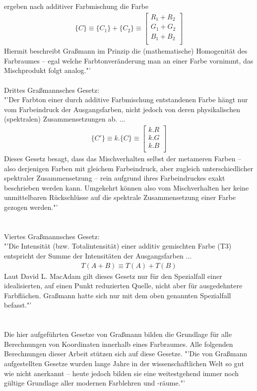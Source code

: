 \documentclass[11pt]{scrartcl}
\begin{document}
ergeben nach additiver Farbmischung die Farbe
\begin{align}\label{Equ:4}
    \{C\} \equiv \{C_1\} +\{C_2\} \equiv \left[ \begin{array}{r}
        R_1 + R_2 \\
        G_1 + G_2 \\
        B_1 + B_2 \\
    \end{array}\right]
\end{align}
Hiermit beschreibt Graßmann im Prinzip die (mathematische) Homogenität des Farbraumes – egal welche Farbtonveränderung man an einer Farbe
vornimmt, das Mischprodukt folgt analog."'\cite{wikipediaGrassmannGestze}\\
\\
Drittes Graßmannsches Gesetz:\\
"'Der Farbton einer durch additive Farbmischung entstandenen Farbe hängt nur vom Farbeindruck der Ausgangsfarben, nicht jedoch von deren
physikalischen (spektralen) Zusammensetzungen ab. ...
\begin{align}\label{Equ:5}
    \{C'\} \equiv k.\{C\} \equiv \left[ \begin{array}{r}
        k.R \\
        k.G \\
        k.B \\
    \end{array}\right]
\end{align}
Dieses Gesetz besagt, dass das Mischverhalten selbst der metameren Farben – also derjenigen Farben mit gleichem Farbeindruck, aber
zugleich unterschiedlicher spektraler Zusammensetzung – rein aufgrund ihres Farbeindruckes exakt beschrieben werden kann. Umgekehrt können
also vom Mischverhalten her keine unmittelbaren Rückschlüsse auf die spektrale Zusammensetzung einer Farbe gezogen werden."'\\
\cite{wikipediaGrassmannGestze}\\
\\
Viertes Graßmannsches Gesetz:\\
"'Die Intensität (bzw. Totalintensität) einer additiv gemischten Farbe (T3) entspricht der Summe der Intensitäten der Ausgangsfarben ...
\begin{align}\label{Equ:6}
    T(A+B) \equiv T(A) + T(B)
\end{align}
Laut David L. MacAdam gilt dieses Gesetz nur für den Spezialfall einer idealisierten, auf einen Punkt reduzierten Quelle, nicht aber für
ausgedehntere Farbflächen. Graßmann hatte sich nur mit dem oben genannten Spezialfall befasst."'\\
\cite{wikipediaGrassmannGestze}\\
\\
Die hier aufgeführten Gesetze von Graßmann bilden die Grundlage für alle Berechnungen von Koordinaten innerhalb eines Farbraumes. Alle folgenden
Berechnungen dieser Arbeit stützen sich auf diese Gesetze. "'Die von Graßmann aufgestellten Gesetze wurden lange Jahre in der
wissenschaftlichen Welt so gut wie nicht anerkannt – heute jedoch bilden sie eine weitestgehend immer noch gültige Grundlage aller modernen
Farblehren und -räume."' \cite{wikipediaGrassmannGestze}
\end{document}
